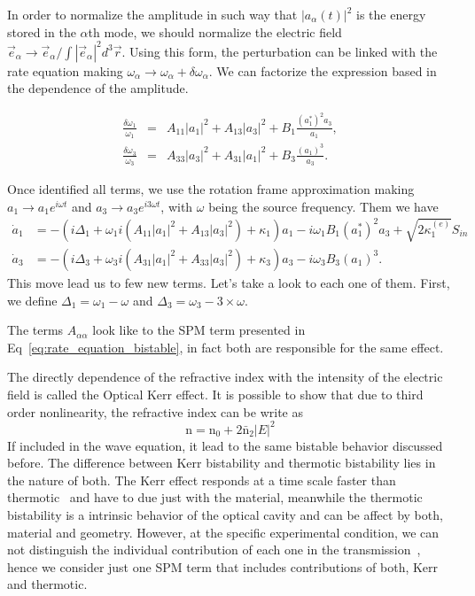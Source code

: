 In order to normalize the amplitude in such way that $|a_\alpha(t)|^2$ is the energy stored in the $\alpha$th mode, we should normalize the electric field $\vec{e}_\alpha \rightarrow\vec{e}_\alpha/\int|\vec{e}_\alpha|^2 d^3\vec{r}$. Using this form, the perturbation can be linked with the rate equation making $\omega_\alpha \rightarrow \omega_\alpha + \delta\omega_\alpha$. We can factorize the expression based in the dependence of the amplitude. 

\begin{eqnarray}
\frac{\delta\omega_1}{\omega_1} &=& A_{11}|a_1|^2 + A_{13}|a_3|^2 + B_1\frac{(a^*_1)^2a_3}{a_1},\label{eq:ir_per}\\
\frac{\delta\omega_3}{\omega_3} &=& A_{33}|a_3|^2 + A_{31}|a_1|^2 + B_3\frac{(a_1)^3}{a_3}\label{eq:vis_per}.
\end{eqnarray}

Once identified all terms, we use the rotation frame approximation making $a_1 \rightarrow a_1e^{i\omega t}$ and $a_3 \rightarrow a_3e^{i3\omega t}$, with $\omega$ being the source frequency. Them we have 
\begin{subequations}
    \begin{alignat}{1}
        \dot{a}_1 &= -\left(i\Delta_1 + \omega_1i(A_{11} |a_1|^2 + A_{13} |a_3|^2) + \kappa_{1}\right)a_1 - i\omega_1 B_1(a^*_1)^2a_3 
        +\sqrt{2 \kappa^{(e)}_1}S_{in}
        \label{eq:taxa_ir_broad}\\
        \dot{a}_3 &= -\left(i\Delta_3 + \omega_3i(A_{31} |a_1|^2 + A_{33} |a_3|^2) + \kappa_{3}\right)a_3 - i\omega_3 B_3(a_1)^3.
        \label{eq:taxa_vis_broad}
    \end{alignat}
    \label{eq:rate_broad}
\end{subequations}
This move lead us to few new terms. Let's take a look to each one of them. First, we define $\Delta_1 = \omega_1 - \omega$ and $\Delta_3 = \omega_3 - 3\times\omega$. 

The terms $A_{\alpha\alpha}$ look like to the SPM term presented in Eq~\ref{eq:rate_equation_bistable}, in fact both are responsible for the same effect. 

The directly dependence of the refractive index with the intensity of the electric field is called the Optical Kerr effect. It is possible to show that due to third order nonlinearity, the refractive index can be write as~\needcit
\begin{equation}
    \text{n} = \text{n}_0 + 2\bar{\text{n}}_2|E|^2 
\end{equation}
If included in the wave equation, it lead to the same bistable behavior discussed before. The difference between Kerr bistability and thermotic bistability lies in the nature of both. The Kerr effect responds at a time scale faster than thermotic\needcit~ and have to due just with the material, meanwhile the thermotic bistability is a intrinsic behavior of the optical cavity and can be affect by both, material and geometry. However, at the specific experimental condition, we can not distinguish the individual contribution of each one in the transmission~\needcit, hence we consider just one SPM term that includes contributions of both, Kerr and thermotic. 

